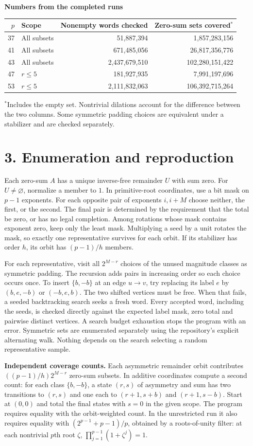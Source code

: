 \documentclass[11pt]{article}
\newcommand{\sect}[1]{\section*{\color{ink}#1}}
\newcommand{\subh}[1]{\par\smallskip\textbf{#1}\par\nobreak}
\begin{document}
\subh{Numbers from the completed runs}
\begin{center}
\begin{tabular}{r l r r}\toprule
$p$ & Scope & Nonempty words checked & Zero-sum sets covered$^{*}$\\\midrule
37 & All subsets & 51,887,394 & 1,857,283,156\\
41 & All subsets & 671,485,056 & 26,817,356,776\\
43 & All subsets & 2,437,679,510 & 102,280,151,422\\
47 & $r\le5$ & 181,927,935 & 7,991,197,696\\
53 & $r\le5$ & 2,111,832,063 & 106,392,715,264\\\bottomrule
\end{tabular}
\end{center}
$^{*}$Includes the empty set. Nontrivial dilations account for the difference between the two columns. Some symmetric padding choices are equivalent under a stabilizer and are checked separately.
\newpage
\sect{3. Enumeration and reproduction}
Each zero-sum $A$ has a unique inverse-free remainder $U$ with sum zero. For $U\ne\varnothing$, normalize a member to $1$. In primitive-root coordinates, use a bit mask on $p-1$ exponents. For each opposite pair of exponents $i,i+M$ choose neither, the first, or the second. The final pair is determined by the requirement that the total be zero, or has no legal completion. Among rotations whose mask contains exponent zero, keep only the least mask. Multiplying a seed by a unit rotates the mask, so exactly one representative survives for each orbit. If its stabilizer has order $h$, its orbit has $(p-1)/h$ members.

For each representative, visit all $2^{M-r}$ choices of the unused magnitude classes as symmetric padding. The recursion adds pairs in increasing order so each choice occurs once. To insert $\{b,-b\}$ at an edge $u\to v$, try replacing its label $e$ by $(b,e,-b)$ or $(-b,e,b)$. The two shifted vertices must be free. When that fails, a seeded backtracking search seeks a fresh word. Every accepted word, including the seeds, is checked directly against the expected label mask, zero total and pairwise distinct vertices. A search budget exhaustion stops the program with an error. Symmetric sets are enumerated separately using the repository's explicit alternating walk. Nothing depends on the search selecting a random representative sample.

\textbf{Independent coverage counts.} Each asymmetric remainder orbit contributes $((p-1)/h)2^{M-r}$ zero-sum subsets. In additive coordinates compute a second count: for each class $\{b,-b\}$, a state $(r,s)$ of asymmetry and sum has two transitions to $(r,s)$ and one each to $(r+1,s+b)$ and $(r+1,s-b)$. Start at $(0,0)$ and total the final states with $s=0$ in the given scope. The program requires equality with the orbit-weighted count. In the unrestricted run it also requires equality with $(2^{p-1}+p-1)/p$, obtained by a roots-of-unity filter: at each nontrivial $p$th root $\zeta$, $\prod_{j=1}^{p-1}(1+\zeta^j)=1$.
\end{document}
